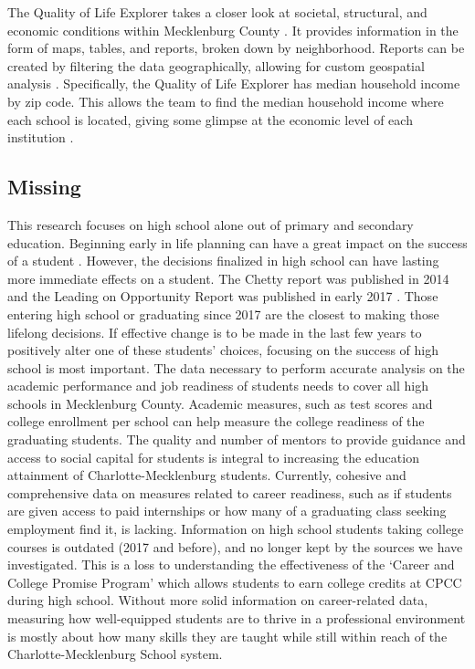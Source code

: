 The Quality of Life Explorer takes a closer look at societal, structural, and economic conditions within Mecklenburg County \parencite[][]{QualityofLife}.
It provides information in the form of maps, tables, and reports, broken down by neighborhood. Reports can be created by filtering the data geographically, allowing for custom geospatial analysis \parencite[][]{QualityofLife}.
Specifically, the Quality of Life Explorer has median household income by zip code. This allows the team to find the median household income where each school is located, giving some glimpse at the economic level of each institution \parencite[][]{QualityofLife}.

\subsection{Missing}
This research focuses on high school alone out of primary and secondary education. Beginning early in life planning can have a great impact on the success of a student \parencite[][]{magnuson2000}. 
However, the decisions finalized in high school can have lasting more immediate effects on a student. 
The Chetty report was published in 2014 and the Leading on Opportunity Report was published in early 2017 \parencite[][]{chetty2014, LOO}. Those entering high school or graduating since 2017 are the closest to making those lifelong decisions. 
If effective change is to be made in the last few years to positively alter one of these students' choices, focusing on the success of high school is most important. 
The data necessary to perform accurate analysis on the academic performance and job readiness of students needs to cover all high schools in Mecklenburg County. 
Academic measures, such as test scores and college enrollment per school can help measure the college readiness of the graduating students. The quality and number of mentors to provide guidance and access to social capital for students is integral to increasing the education attainment of Charlotte-Mecklenburg students. 
Currently, cohesive and comprehensive data on measures related to career readiness, such as if students are given access to paid internships or how many of a graduating class seeking employment find it, is lacking. 
Information on high school students taking college courses is outdated (2017 and before), and no longer kept by the sources we have investigated. 
This is a loss to understanding the effectiveness of the `Career and College Promise Program' which allows students to earn college credits at CPCC during high school. 
Without more solid information on career-related data, measuring how well-equipped students are to thrive in a professional environment is mostly about how many skills they are taught while still within reach of the Charlotte-Mecklenburg School system. 

